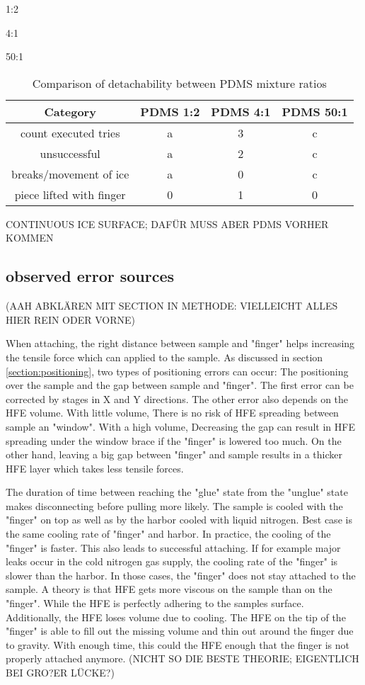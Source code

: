 1:2

4:1

50:1 

\begin{table}
	\centering
	\begin{tabular}{|c|c|c|c|}
		\hline
		Category & PDMS 1:2 & PDMS 4:1 & PDMS 50:1 \\
		\hline
		\hline
		count executed tries & a & 3 & c\\
		\hline
		unsuccessful & a & 2 & c\\
		\hline
		breaks/movement of ice & a & 0 & c\\
		\hline
		piece lifted with finger & 0 & 1 & 0\\
		\hline		
	\end{tabular}
	\caption{Comparison of detachability between PDMS mixture ratios}
	\label{table:AttemptsPDMS}
\end{table}


CONTINUOUS ICE SURFACE; DAFÜR MUSS ABER PDMS VORHER KOMMEN

\FloatBarrier

\subsection{observed error sources}

(AAH ABKLÄREN MIT SECTION IN METHODE: VIELLEICHT ALLES HIER REIN ODER VORNE)

When attaching, the right distance between sample and "finger" helps increasing the tensile force which can applied to the sample. As discussed in section \ref{section:positioning}, two types of positioning errors can occur: The positioning over the sample and the gap between sample and "finger". The first error can be corrected by stages in X and Y directions. The other error also depends on the HFE volume. With little volume, There is no risk of HFE spreading between sample an "window". With a high volume, Decreasing the gap can result in HFE spreading under the window brace if the "finger" is lowered too much. On the other hand, leaving a big gap between "finger" and sample results in a thicker HFE layer which takes less tensile forces.

The duration of time between reaching the "glue" state from the "unglue" state makes disconnecting before pulling more likely. The sample is cooled with the "finger" on top as well as by the harbor cooled with liquid nitrogen. Best case is the same cooling rate of "finger" and harbor. In practice, the cooling of the "finger" is faster. This also leads to successful attaching. If for example major leaks occur in the cold nitrogen gas supply, the cooling rate of the "finger" is slower than the harbor. In those cases, the "finger" does not stay attached to the sample. A theory is that HFE gets more viscous on the sample than on the "finger". While the HFE is perfectly adhering to the samples surface. Additionally, the HFE loses volume due to cooling. The HFE on the tip of the "finger" is able to fill out the missing volume and thin out around the finger due to gravity. With enough time, this could the HFE enough that the finger is not properly attached anymore. (NICHT SO DIE BESTE THEORIE; EIGENTLICH BEI GRO?ER LÜCKE?)


